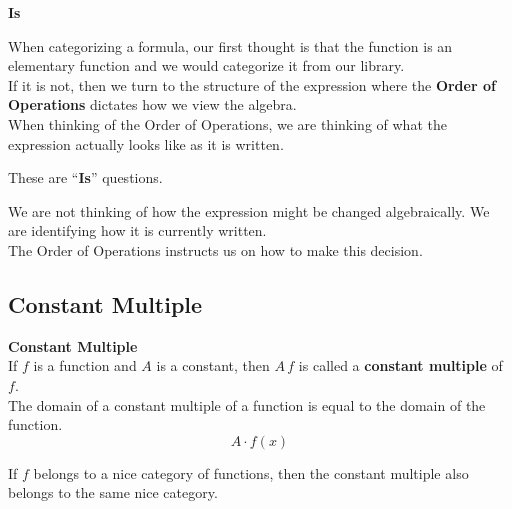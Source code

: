 \documentclass{ximera}
\begin{document}
\begin{warning}  \textbf{\textcolor{red!70!black}{Is}}


When categorizing a formula, our first thought is that the function is an elementary function and we would categorize it from our library. \\

If it is not, then we turn to the structure of the expression where the \textbf{Order of Operations} dictates how we view the algebra. \\

When thinking of the Order of Operations, we are thinking of what the expression actually looks like as it is written.


\begin{center}
These are ``\textbf{\textcolor{red!70!black}{Is}}'' questions.
\end{center}

We are not thinking of how the expression might be changed algebraically.  We are identifying how it is currently written. \\

The Order of Operations instructs us on how to make this decision.

\end{warning}



\subsection*{Constant Multiple}


\begin{template}  \textbf{\textcolor{blue!55!black}{Constant Multiple}} \\


If  $f$ is a function and $A$ is a constant, then $A \, f$ is called a \textbf{\textcolor{green!50!black}{constant multiple}} of $f$. \\

The domain of a constant multiple of a function is equal to the domain of the function. \\


\[ A \cdot f(x)  \]



\end{template}



\begin{observation}

If $f$ belongs to a nice category of functions, then the constant multiple also belongs to the same nice category.

\end{observation}
\end{document}
